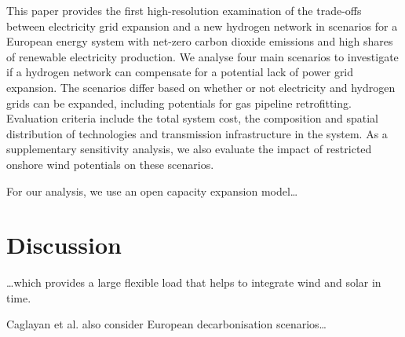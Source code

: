 \documentclass{article}
\begin{document}
This paper provides the first high-resolution examination of the trade-offs
between electricity grid expansion and a new hydrogen network in scenarios for a
European energy system with net-zero carbon dioxide emissions and high shares of
renewable electricity production. We analyse four main scenarios to investigate
if a hydrogen network can compensate for a potential lack of power grid
expansion. The scenarios differ based on whether or not electricity and hydrogen
grids can be expanded, including potentials for gas pipeline retrofitting.
Evaluation criteria include the total system cost, the composition and spatial
distribution of technologies and transmission infrastructure in the system. As a
supplementary sensitivity analysis, we also evaluate the impact of restricted
onshore wind potentials on these scenarios.

For our analysis, we use an open capacity expansion model\dots

\section*{Discussion}

\dots which provides a large flexible load that helps to integrate wind and
solar in time.

Caglayan et al. also consider European decarbonisation
scenarios\dots
\end{document}
